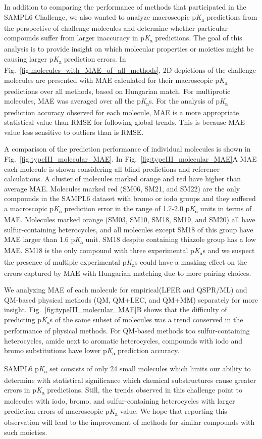\documentclass[9pt,lineno,final]{elife}
\newcommand{\pKa}{p\textit{K}\textsubscript{a}}
\begin{document}
In addition to comparing the performance of methods that participated in the SAMPL6 Challenge, we also wanted to analyze macroscopic \pKa{} predictions from the perspective of challenge molecules and determine whether particular compounds suffer from larger inaccuracy in \pKa{} predictions. 
The goal of this analysis is to provide insight on which molecular properties or moieties might be causing larger \pKa{} prediction errors.
In Fig.~\ref{fig:molecules_with_MAE_of_all_methods}, 2D depictions of the challenge molecules are presented with MAE calculated for their macroscopic \pKa{} predictions over all methods, based on Hungarian match. For multiprotic molecules, MAE was averaged over all the \pKa{}s. For the analysis of \pKa{} prediction accuracy observed for each molecule, MAE is a more appropriate statistical value than RMSE for following global trends. This is because MAE value less sensitive to outliers than is RMSE.

A comparison of the prediction performance of individual molecules is shown in Fig.~\ref{fig:typeIII_molecular_MAE}. In Fig.~\ref{fig:typeIII_molecular_MAE}A MAE each molecule is shown considering all blind predictions and reference calculations. A cluster of molecules marked orange and red have higher than average MAE. 
Molecules marked red (SM06, SM21, and SM22) are the only compounds in the SAMPL6 dataset with bromo or iodo groups and they suffered a macroscopic \pKa{} prediction error in the range of 1.7-2.0 \pKa{} units in terms of MAE.
Molecules marked orange (SM03, SM10, SM18, SM19, and SM20) all have sulfur-containing heterocycles, and all molecules except SM18 of this group have MAE larger than 1.6 \pKa{} unit.
SM18 despite containing thiazole group has a low MAE. SM18 is the only compound with three experimental \pKa{}s and we suspect the presence of multiple experimental \pKa{}s could have a masking effect on the errors captured by MAE with Hungarian matching due to more pairing choices.

We analyzing MAE of each molecule for empirical(LFER and QSPR/ML) and QM-based physical methods (QM, QM+LEC, and QM+MM) separately for more insight. 
Fig.~\ref{fig:typeIII_molecular_MAE}B shows that the difficulty of predicting \pKa{}s of the same subset of molecules was a trend conserved in the performance of physical methods. For QM-based methods too sulfur-containing heterocycles, amide next to aromatic heterocycles, compounds with iodo and bromo substitutions have lower \pKa{} prediction accuracy.

SAMPL6 \pKa{} set consists of only 24 small molecules which limits our ability to determine with statistical significance which chemical substructures cause greater errors in \pKa{} predictions. Still, the trends observed in this challenge point to molecules with iodo, bromo, and sulfur-containing heterocycles with larger prediction errors of macroscopic \pKa{} value. We hope that reporting this observation will lead to the improvement of methods for similar compounds with such moieties. 
\end{document}
